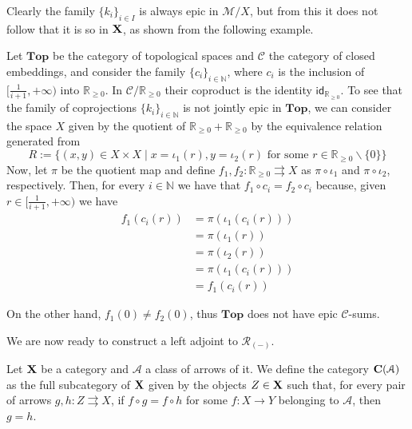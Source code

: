 \documentclass[a4paper,UKenglish,cleveref,pdftex,thm-restate,numberwithinsect]{lipics-v2021}
\newcommand{\cat}[1]{\ensuremath{\mathbf{#1}}}
\newcommand{\id}[1]{\mathsf{id}_{#1}}
\def\C{\textbf {\textup{C}}}
\def\X{\textbf {\textup{X}}}
\begin{document}
Clearly the family $\{k_i\}_{i\in I}$ is always epic in $\mathcal{M}/X$, but from this it does not follow that it is so in $\X$, as shown from the following example.

\begin{example}Let $\cat{Top}$ be the category of topological spaces and $\mathcal{C}$ the category of closed embeddings, and  consider the family $\{c_i\}_{i\in \mathbb{N}}$, where $c_i$ is the inclusion of $[\frac{1}{i+1}, +\infty)$ into $\mathbb{R}_{\geq 0}$. In $\mathcal{C}/\mathbb{R}_{\geq 0}$ their coproduct is the  identity $\id{\mathbb{R}_{\geq 0}}$. To see that the family of coprojections $\{k_i\}_{i\in \mathbb{N}}$ is not jointly epic in $\cat{Top}$, we can consider the space $X$ given by the quotient of $\mathbb{R}_{\geq 0}+\mathbb{R}_{\geq 0}$ by the equivalence relation generated from
	\[R:=\{(x, y)\in X\times X \mid x=\iota_1(r), y=\iota_2(r) \text{ for some } r \in \mathbb{R}_{\geq 0}\smallsetminus\{0\}\}\]
	Now, let $\pi$ be the quotient map and define $f_1, f_2\colon \mathbb{R}_{\geq 0}\rightrightarrows X$ as $\pi\circ \iota_1$ and $\pi \circ \iota_2$, respectively. Then, for every $i\in \mathbb{N}$ we have that $f_1\circ c_i=f_2\circ c_i$ because, given $r\in [\frac{1}{i+1}, +\infty)$ we have
	\begin{align*}
		f_1(c_i(r))&=\pi(\iota_1(c_i(r)))\\&=\pi(\iota_1(r))\\&=\pi(\iota_2(r))\\&=\pi(\iota_1(c_i(r)))\\&=f_1(c_i(r))
	\end{align*}	
	
On the other hand, $f_1(0)\neq f_2(0)$, thus $\cat{Top}$ does not have epic $\mathcal{C}$-sums.
\end{example}
\begin{example}
\end{example}

\begin{example}
\end{example}
\begin{example}
\end{example}

We are now ready to construct a left adjoint to $\mathcal{R}_{(-)}$.

\begin{definition} 
	Let $\X$ be a category and $\mathcal{A}$ a class of arrows of it. We define the category $\C(\mathcal{A})$ as the full subcategory of $\X$ given by the objects $Z\in \X$ such that, for every  pair of arrows $g,h\colon Z\rightrightarrows X$, if $f\circ g=f\circ h$ for some $f\colon X\to Y$ belonging to $\mathcal{A}$, then $g=h$.
\end{definition}
\end{document}
